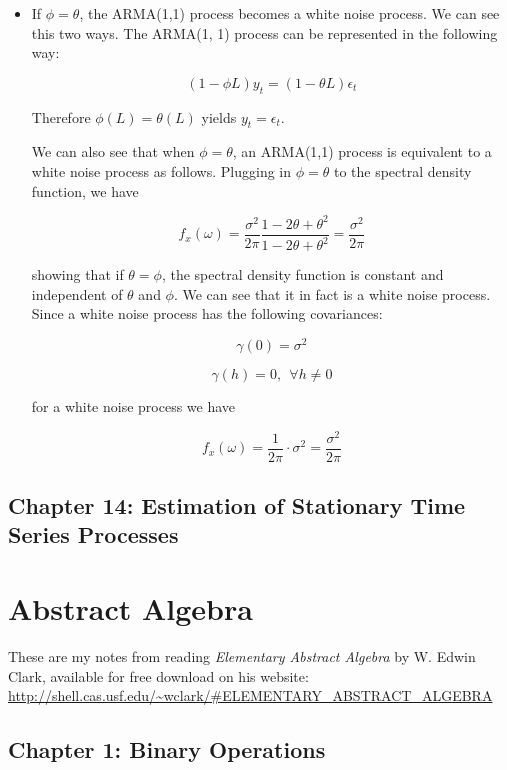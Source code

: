 \documentclass{article}
\begin{document}
\begin{itemize}
\item If \(\phi = \theta\), the ARMA(1,1) process becomes a white noise process. We can see this two ways. The ARMA(1, 1) process can be represented in the following way:

\[
(1 - \phi L)y_t = (1 - \theta L) \epsilon_t
\]

Therefore \(\phi(L) = \theta(L)\) yields \(y_t = \epsilon_t\). 


We can also see that when \(\phi = \theta\), an ARMA(1,1) process is equivalent to a white noise process as follows. Plugging in \(\phi = \theta\) to the spectral density function, we have

\[
f_x(\omega) = \frac{\sigma^2}{2\pi} \frac{1 - 2\theta + \theta^2}{1 -2\theta + \theta^2} = \frac{\sigma^2}{2\pi}
\]

showing that if \(\theta = \phi\), the spectral density function is constant and independent of \(\theta\) and \(\phi \). We can see that it in fact is a white noise process. Since a white noise process has the following covariances:

\[
\gamma(0) = \sigma^2
\]

\[
\gamma(h) =0, \ \ \forall h \neq 0
\]

for a white noise process we have

\[
f_x(\omega) = \frac{1}{2\pi} \cdot \sigma^2 = \frac{\sigma^2}{2 \pi}
\]


\end{itemize}

\subsection{Chapter 14: Estimation of Stationary Time Series Processes}



\section{Abstract Algebra}

These are my notes from reading \textit{Elementary Abstract Algebra} by W. Edwin Clark, available for free download on his website: \url{http://shell.cas.usf.edu/~wclark/#ELEMENTARY_ABSTRACT_ALGEBRA}

\subsection{Chapter 1: Binary Operations}
\end{document}
